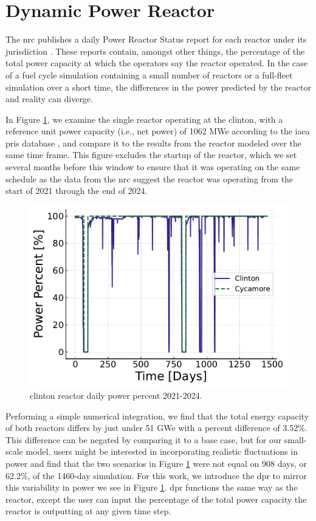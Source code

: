 \section{Dynamic Power Reactor}
\label{sec:dpr_method}

The \gls{nrc} publishes a daily Power Reactor Status report for each reactor
under its jurisdiction \cite{nrc_power_2025}. These reports contain, amongst
other things, the percentage of the total power capacity at which the operators
say the reactor operated. In the case of a fuel cycle simulation containing a
small number of reactors or a full-fleet simulation over a short time, the
differences in the power predicted by the \cycamore reactor and reality can
diverge.

In Figure \ref{fig:pp_full}, we examine the single reactor operating at the
\gls{clinton}, with a reference unit power capacity (i.e., net power) of 1062
MWe according to the \gls{iaea} \gls{pris} database \cite{IAEA_PRIS}, and
compare it to the results from the \cycamore reactor modeled over the same time
frame. This figure excludes the startup of the \cycamore reactor, which we set
several months before this window to ensure that it was operating on the same
schedule as the data from the \gls{nrc} suggest the reactor was operating
from the start of 2021 through the end of 2024.

\begin{figure}[H]
  \centering
  \includegraphics[width=0.7\linewidth]{images/power_reactor/power_percent_clinton_fake.pdf}
  \caption{\gls{clinton} reactor daily power percent 2021-2024.}
  \label{fig:pp_full}
\end{figure}

Performing a simple numerical integration, we find that the total energy
capacity of both reactors differs by just under 51 GWe with a percent difference
of 3.52\%. This difference can be negated by comparing it to a base case, but
for our small-scale model, users might be interested in incorporating realistic
fluctuations in power and find that the two scenarios in Figure
\ref{fig:pp_full} were not equal on 908 days, or 62.2\%, of the 1460-day
simulation. For this work, we introduce the \gls{dpr} to mirror this
variability in power we see in Figure \ref{fig:pp_full}. \gls{dpr} functions
the same way as the \cycamore reactor, except the user can input the percentage
of the total power capacity the reactor is outputting at any given time step.



